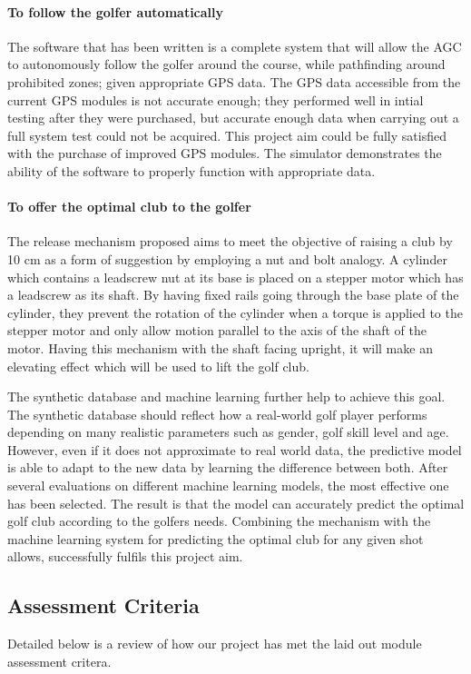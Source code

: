 \documentclass[11pt,landscape]{article}
\begin{document}
\begin{multicols}{3}
\paragraph{To follow the golfer automatically}
The software that has been written is a complete system that will allow the AGC
to autonomously follow the golfer around the course, while pathfinding around
prohibited zones; given appropriate GPS data. The GPS data accessible from the
current GPS modules is not accurate enough; they performed well in intial
testing after they were purchased, but accurate enough data when carrying out a
full system test could not be acquired. This project aim could be fully
satisfied with the purchase of improved GPS modules. The simulator demonstrates
the ability of the software to properly function with appropriate data.

\paragraph{To offer the optimal club to the golfer}
The release mechanism proposed aims to meet the objective of raising a club by
10 cm as a form of suggestion by employing a nut and bolt analogy. A cylinder
which contains a leadscrew nut at its base is placed on a stepper motor which
has a leadscrew as its shaft. By having fixed rails going through the base plate
of the cylinder, they prevent the rotation of the cylinder when a torque is
applied to the stepper motor and only allow motion parallel to the axis of the
shaft of the motor. Having this mechanism with the shaft facing upright, it will
make an elevating effect which will be used to lift the golf club.

The synthetic database and machine learning further help to achieve this goal.
The synthetic database should reflect how a real-world golf player performs
depending on many realistic parameters such as gender, golf skill level and age.
However, even if it does not approximate to real world data, the predictive
model is able to adapt to the new data by learning the difference between both.
After several evaluations on different machine learning models, the most
effective one has been selected. The result is that the model can accurately
predict the optimal golf club according to the golfers needs. Combining the
mechanism with the machine learning system for predicting the optimal club for
any given shot allows, successfully fulfils this project aim.


\subsection{Assessment Criteria}
Detailed below is a review of how our project has met the laid out module
assessment critera.

\end{multicols}
\end{document}
